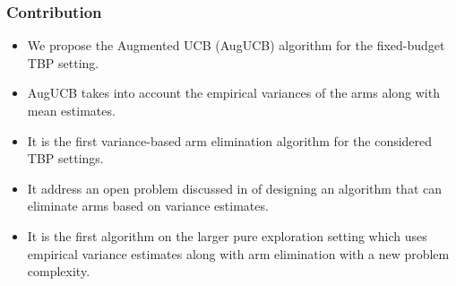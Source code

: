 \begin{frame}
\frametitle{Contribution}
\begin{itemize}
\item<1-> We propose the Augmented UCB (AugUCB) \cite{DBLP:journals/corr/MukherjeeNSR17} algorithm for the fixed-budget TBP setting.
\item<2-> AugUCB takes into account the empirical variances of the arms along with mean estimates.
\item<3-> It is the first variance-based arm elimination algorithm for the considered TBP settings. 
\item<4-> It address an open problem discussed in \cite{auer2010ucb} of designing an algorithm that can eliminate arms based on variance estimates.
\item<5-> It is the first algorithm on the larger pure exploration setting which uses empirical variance estimates along with arm elimination with a new problem complexity.
\end{itemize}
\end{frame}


%


